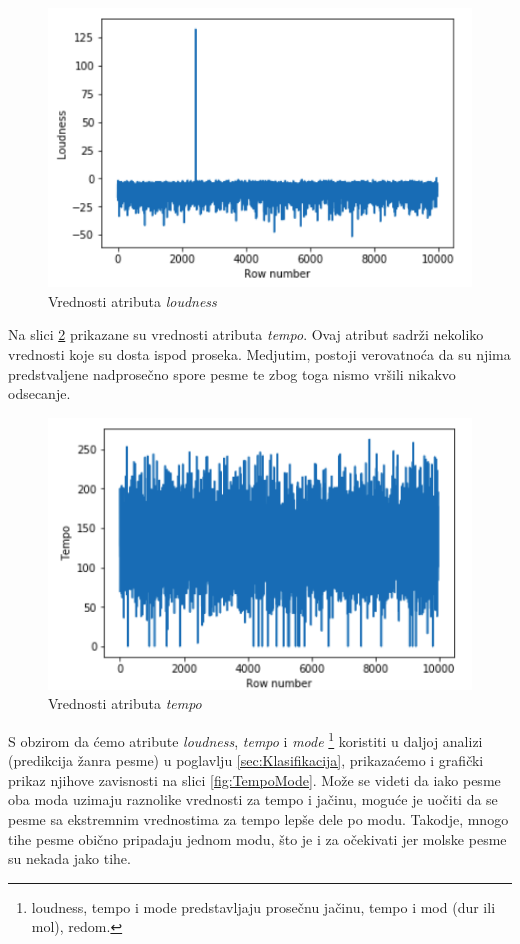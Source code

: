 \begin{figure}[H]
    \centering
    \includegraphics[scale=0.55]{resources/loudness.png}
    \caption{Vrednosti atributa \emph{loudness}}
    \label{fig:loudness}
\end{figure}

Na slici \ref{fig:tempo} prikazane su vrednosti atributa \emph{tempo}. Ovaj atribut sadr\v{z}i nekoliko vrednosti koje su dosta ispod proseka. Medjutim, postoji verovatno\'c{}a da su njima predstvaljene nadprose\v{c}no spore pesme te zbog toga nismo vr\v{s}ili nikakvo odsecanje.

\begin{figure}[H]
    \centering
    \includegraphics[scale=0.6]{resources/tempo.png}
    \caption{Vrednosti atributa \emph{tempo}}
    \label{fig:tempo}
\end{figure}

S obzirom da \'c{}emo atribute \emph{loudness}, \emph{tempo} i \emph{mode} \footnote{loudness, tempo i mode predstavljaju prose\v{c}nu ja\v{c}inu, tempo i mod (dur ili mol), redom.} koristiti u daljoj analizi (predikcija \v{z}anra pesme) u poglavlju \ref{sec:Klasifikacija}, prikaza\'c{}emo i grafi\v{c}ki prikaz njihove zavisnosti na slici \ref{fig:TempoMode}. Mo\v{z}e se videti da iako pesme oba moda uzimaju raznolike vrednosti za tempo i ja\v{c}inu, mogu\'c{}e je uo\v{c}iti da se pesme sa ekstremnim vrednostima za tempo lep\v{s}e dele po modu. Takodje, mnogo tihe pesme obi\v{c}no pripadaju jednom modu, \v{s}to je i za o\v{c}ekivati jer molske pesme su nekada jako tihe.

